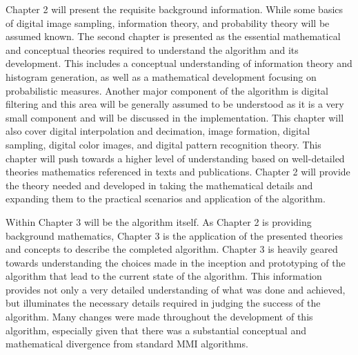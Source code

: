 %
%
%
%
%
%
%
%
%

%
%
%



Chapter 2 will present the requisite background information. While some basics of digital image sampling, information theory, and probability theory will be assumed known. The second chapter is presented as the essential mathematical and conceptual theories required to understand the algorithm and its development. This includes a conceptual understanding of information theory and histogram generation, as well as a mathematical development focusing on probabilistic measures. Another major component of the algorithm is digital filtering and this area will be generally assumed to be understood as it is a very small component and will be discussed in the implementation. This chapter will also cover digital interpolation and decimation, image formation, digital sampling, digital color images, and digital pattern recognition theory. This chapter will push towards a higher level of understanding based on well-detailed theories mathematics referenced in texts and publications. Chapter 2 will provide the theory needed and developed in taking the mathematical details and expanding them to the practical scenarios and application of the algorithm.

Within Chapter 3 will be the algorithm itself. As Chapter 2 is providing background mathematics, Chapter 3 is the application of the presented theories and concepts to describe the completed algorithm. Chapter 3 is heavily geared towards understanding the choices made in the inception and prototyping of the algorithm that lead to the current state of the algorithm. This information provides not only a very detailed understanding of what was done and achieved, but illuminates the necessary details required in judging the success of the algorithm. Many changes were made throughout the development of this algorithm, especially given that there was a substantial conceptual and mathematical divergence from standard MMI algorithms.

